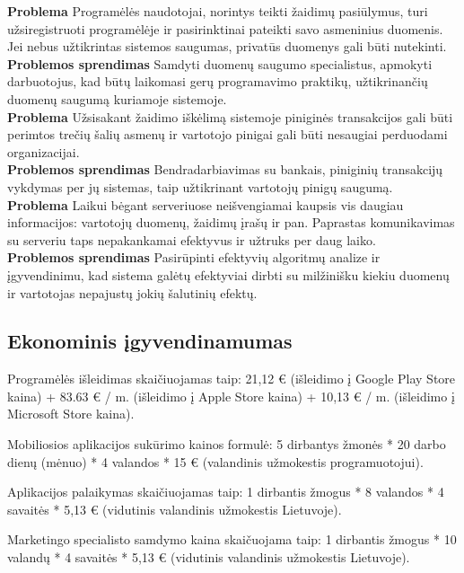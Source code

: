 \documentclass{VUMIFPSkursinis}
\begin{document}
		\noindent \textbf{Problema} Programėlės naudotojai, norintys teikti žaidimų pasiūlymus, turi užsiregistruoti programėlėje ir pasirinktinai pateikti savo asmeninius duomenis. Jei nebus užtikrintas sistemos saugumas, privatūs duomenys gali būti nutekinti.\\
		\noindent \textbf{Problemos sprendimas} Samdyti duomenų saugumo specialistus, apmokyti darbuotojus, kad būtų laikomasi gerų programavimo praktikų, užtikrinančių duomenų saugumą kuriamoje sistemoje. \\
		
		\noindent \textbf{Problema} Užsisakant žaidimo iškėlimą sistemoje piniginės transakcijos gali būti perimtos trečių šalių asmenų ir vartotojo pinigai gali būti nesaugiai perduodami organizacijai.\\
		\noindent \textbf{Problemos sprendimas} Bendradarbiavimas su bankais, piniginių transakcijų vykdymas per jų sistemas, taip užtikrinant vartotojų pinigų saugumą. \\
		
		\noindent \textbf{Problema} Laikui bėgant serveriuose neišvengiamai kaupsis vis daugiau informacijos: vartotojų duomenų, žaidimų įrašų ir pan. Paprastas komunikavimas su serveriu taps nepakankamai efektyvus ir užtruks per daug laiko.\\
		\noindent \textbf{Problemos sprendimas} Pasirūpinti efektyvių algoritmų analize ir įgyvendinimu, kad sistema galėtų efektyviai dirbti su milžinišku kiekiu duomenų ir vartotojas nepajustų jokių šalutinių efektų. \\
		
	\subsection{Ekonominis įgyvendinamumas}	
		Programėlės išleidimas skaičiuojamas taip: 21,12 € (išleidimo į Google 
		Play Store kaina) + 83.63 € / m. (išleidimo į Apple Store kaina)  + 10,13 
		€ / m. (išleidimo į Microsoft Store kaina).
		
		Mobiliosios aplikacijos sukūrimo kainos formulė: 5 dirbantys žmonės * 20 
		darbo dienų (mėnuo) * 4 valandos * 15 € (valandinis užmokestis 
		programuotojui).

		Aplikacijos palaikymas skaičiuojamas taip: 1 dirbantis žmogus * 8 valandos * 4 
		savaitės * 5,13 € (vidutinis valandinis užmokestis Lietuvoje).

		Marketingo specialisto samdymo kaina skaičuojama taip: 1 dirbantis žmogus * 
		10 valandų * 4 savaitės * 5,13 € (vidutinis valandinis užmokestis Lietuvoje).
\end{document}
